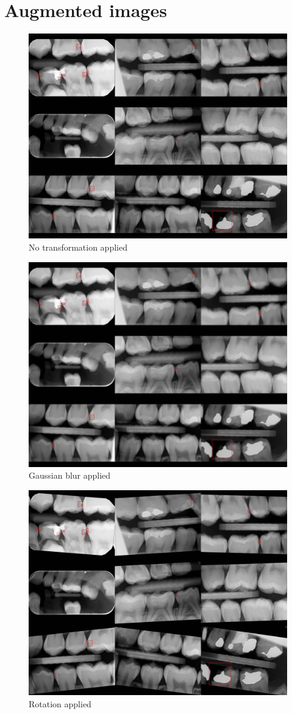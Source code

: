 \section{Augmented images}
\label{appendix:img_transformations}
\begin{figure}
    \includegraphics[width =0.8\linewidth]{images/no_trasnforms.jpg}
    \caption{No transformation applied}
\end{figure}
\begin{figure}
    \includegraphics[width =0.8\linewidth]{images/gaussian_blur.jpg}
    \caption{Gaussian blur applied}
\end{figure}
\begin{figure}
    \includegraphics[width =0.8\linewidth]{images/roate_10.jpg}
    \caption{Rotation applied}
\end{figure}
